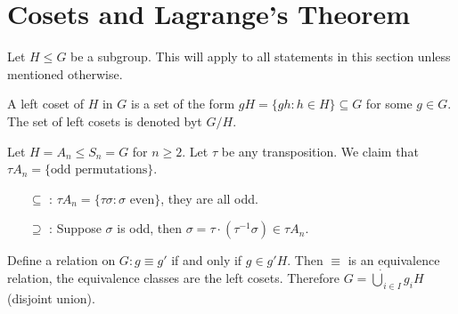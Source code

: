 \section{Cosets and Lagrange's Theorem}

Let \(H \leq G\) be a subgroup. This will apply to all statements in this section unless mentioned otherwise.

\begin{definition}[Coset]
    A left coset of \(H\) in \(G\) is a set of the form \(gH = \{gh : h \in H\} \subseteq G\) for some \(g \in G\). The set of left cosets is denoted byt \(G / H\).
    \begin{example}
        Let \(H = A_n \leq S_n = G\) for \(n \geq 2\). Let \(\tau\) be any transposition. We claim that \(\tau A_n = \{\text{odd permutations}\}\).
        \begin{enumerate}
            \item [\(\subseteq\)]: \(\tau A_n = \{\tau\sigma : \sigma \text{ even}\}\), they are all odd.
            \item [\(\supseteq\)]: Suppose \(\sigma\) is odd, then \(\sigma = \tau \cdot (\tau^{-1}\sigma) \in \tau A_n\).
        \end{enumerate}
    \end{example}
\end{definition}

\begin{theorem}
    Define a relation on \(G: g \equiv g'\) if and only if \(g \in g'H\). Then \(\equiv\) is an equivalence relation, the equivalence classes are the left cosets. Therefore \(G = \dot{\bigcup}_{i \in I} g_iH\) (disjoint union).
\end{theorem}

